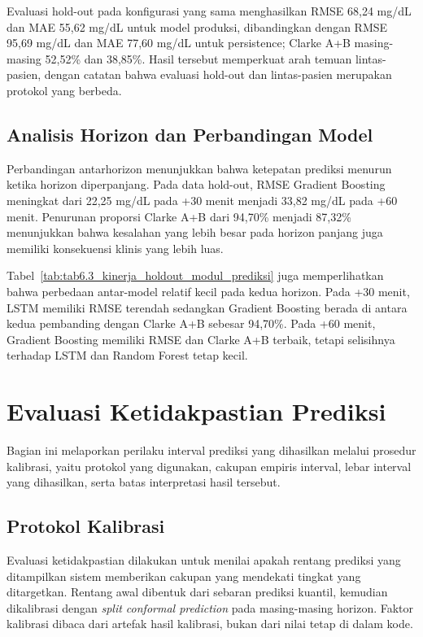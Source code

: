 Evaluasi hold-out pada konfigurasi yang sama menghasilkan RMSE 68,24 mg/dL dan MAE 55,62 mg/dL untuk model produksi, dibandingkan dengan RMSE 95,69 mg/dL
dan MAE 77,60 mg/dL untuk persistence; Clarke A+B masing-masing 52,52\% dan 38,85\%. Hasil tersebut memperkuat arah temuan lintas-pasien, dengan
catatan bahwa evaluasi hold-out dan lintas-pasien merupakan protokol yang berbeda.

\subsection{Analisis Horizon dan Perbandingan Model}
\label{subsec:bab6-analisis-horizon-perbandingan-model}

Perbandingan antarhorizon menunjukkan bahwa ketepatan prediksi menurun ketika horizon diperpanjang. Pada data hold-out, RMSE Gradient Boosting meningkat
dari 22,25 mg/dL pada +30 menit menjadi 33,82 mg/dL pada +60 menit. Penurunan proporsi Clarke A+B dari 94,70\% menjadi 87,32\% menunjukkan bahwa
kesalahan yang lebih besar pada horizon panjang juga memiliki konsekuensi klinis yang lebih luas.

Tabel~\ref{tab:tab6.3_kinerja_holdout_modul_prediksi} juga memperlihatkan bahwa perbedaan antar-model relatif kecil pada kedua horizon. Pada +30 menit, LSTM
memiliki RMSE terendah sedangkan Gradient Boosting berada di antara kedua pembanding dengan Clarke A+B sebesar 94,70\%. Pada +60 menit, Gradient Boosting
memiliki RMSE dan Clarke A+B terbaik, tetapi selisihnya terhadap LSTM dan Random Forest tetap kecil.

\section{Evaluasi Ketidakpastian Prediksi}
\label{sec:bab6-evaluasi-ketidakpastian}

Bagian ini melaporkan perilaku interval prediksi yang dihasilkan melalui prosedur kalibrasi, yaitu protokol yang digunakan, cakupan empiris interval, lebar
interval yang dihasilkan, serta batas interpretasi hasil tersebut.

\subsection{Protokol Kalibrasi}
\label{subsec:bab6-protokol-kalibrasi-interval}

Evaluasi ketidakpastian dilakukan untuk menilai apakah rentang prediksi yang ditampilkan sistem memberikan cakupan yang mendekati tingkat yang ditargetkan.
Rentang awal dibentuk dari sebaran prediksi kuantil, kemudian dikalibrasi dengan \textit{split conformal prediction} pada masing-masing horizon. Faktor
kalibrasi dibaca dari artefak hasil kalibrasi, bukan dari nilai tetap di dalam kode.

